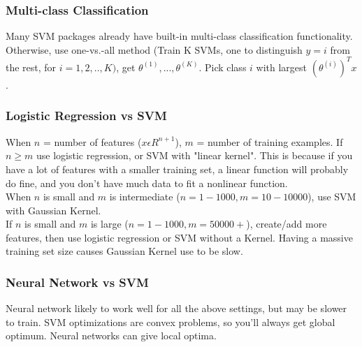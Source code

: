 \documentclass[11pt,letterpaper]{article}
\begin{document}
\subsubsection{Multi-class Classification}
Many SVM packages already have built-in multi-class classification functionality. Otherwise, use one-vs.-all method (Train K SVMs, one to distinguish $y=i$ from the rest, for $i = 1,2,..,K)$, get $\theta^{(1)},...,\theta^{(K)}$. Pick class $i$ with largest $(\theta^{(i)})^Tx$.
\subsubsection{Logistic Regression vs SVM}
When $n$ = number of features ($x \epsilon R^{n+1}$), $m$ = number of training examples. If $n \geq m$ use logistic regression, or SVM with "linear kernel". This is because if you have a lot of features with a smaller training set, a linear function will probably do fine, and you don't have much data to fit a nonlinear function.\\
When $n$ is small and $m$ is intermediate ($n=1-1000, m=10-10000$), use SVM with Gaussian Kernel. \\
If $n$ is small and $m$ is large ($n=1-1000, m=50000+$), create/add more features, then use logistic regression or SVM without a Kernel. Having a massive training set size causes Gaussian Kernel use to be slow.
\subsubsection{Neural Network vs SVM}
Neural network likely to work well for all the above settings, but may be slower to train. SVM optimizations are convex problems, so you'll always get global optimum. Neural networks can give local optima.
\end{document}
